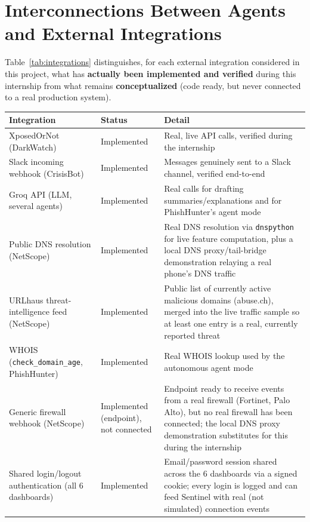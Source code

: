 \documentclass[12pt,a4paper]{report}
\newcommand{\code}[1]{\nolinkurl{#1}}
\begin{document}
\section{Interconnections Between Agents and External Integrations}

Table~\ref{tab:integrations} distinguishes, for each external integration considered in this project, what has \textbf{actually been implemented and verified} during this internship from what remains \textbf{conceptualized} (code ready, but never connected to a real production system).

\begin{table}[htbp]
\centering
\footnotesize
\begin{tabularx}{\textwidth}{@{}>{\raggedright\arraybackslash}p{3.4cm}>{\raggedright\arraybackslash}p{2.8cm}>{\raggedright\arraybackslash}X@{}}
\toprule
\textbf{Integration} & \textbf{Status} & \textbf{Detail} \\
\midrule
XposedOrNot (DarkWatch) & Implemented & Real, live API calls, verified during the internship \\
Slack incoming webhook (CrisisBot) & Implemented & Messages genuinely sent to a Slack channel, verified end-to-end \\
Groq API (LLM, several agents) & Implemented & Real calls for drafting summaries/explanations and for PhishHunter's agent mode \\
Public DNS resolution (NetScope) & Implemented & Real DNS resolution via \texttt{dnspython} for live feature computation, plus a local DNS proxy/tail-bridge demonstration relaying a real phone's DNS traffic \\
URLhaus threat-intelligence feed (NetScope) & Implemented & Public list of currently active malicious domains (abuse.ch), merged into the live traffic sample so at least one entry is a real, currently reported threat \\
WHOIS (\code{check_domain_age}, PhishHunter) & Implemented & Real WHOIS lookup used by the autonomous agent mode \\
Generic firewall webhook (NetScope) & Implemented (endpoint), not connected & Endpoint ready to receive events from a real firewall (Fortinet, Palo Alto), but no real firewall has been connected; the local DNS proxy demonstration substitutes for this during the internship \\
Shared login/logout authentication (all 6 dashboards) & Implemented & Email/password session shared across the 6 dashboards via a signed cookie; every login is logged and can feed Sentinel with real (not simulated) connection events \\

\end{tabularx}
\end{table}
\end{document}
